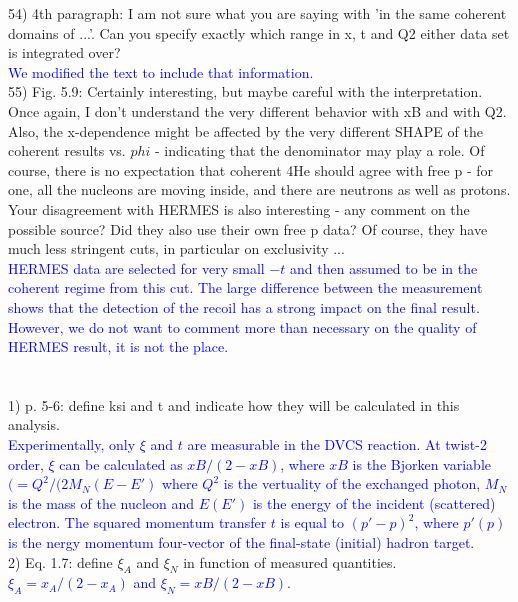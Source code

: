 54) 4th paragraph: I am not sure what you are saying with 'in the same coherent 
domains of ...'. Can you specify exactly which range in x, t and Q2 either data 
set is integrated over?\\
\textcolor{blue}{We modified the text to include that information. }\\

55) Fig. 5.9: Certainly interesting, but maybe careful with the interpretation.  
Once again, I don't understand the very different behavior with xB and with Q2.  
Also, the x-dependence might be affected by the very different SHAPE of the 
coherent results vs. $phi$ - indicating that the denominator may play a role. Of 
course, there is no expectation that coherent 4He should agree with free p - 
for one, all the nucleons are moving inside, and there are neutrons as well as 
protons.  Your disagreement with HERMES is also interesting - any comment on 
the possible source? Did they also use their own free p data? Of course, they 
have much less stringent cuts, in particular on exclusivity ... \\
\textcolor{blue}{HERMES data are selected for very small $-t$ and then assumed
to be in the coherent regime from this cut. The large difference between the 
measurement shows that the detection of the recoil has a strong impact on the 
final result. However, we do not want to comment more than necessary on the 
quality of HERMES result, it is not the place.}\\


\section*{}

1) p. 5-6: define ksi and t and indicate how they will be calculated in this 
analysis.\\
   \textcolor{blue}{ Experimentally, only  $\xi$ and $t$ are 
      measurable in the DVCS reaction. At twist-2 order, $\xi$ can be 
      calculated as $xB/(2-xB)$, where $xB$ is the Bjorken variable $(= 
      Q^{2}/(2M_{N}(E-E')$ where $Q^2$ is the vertuality of the exchanged 
      photon, $M_{N}$ is the mass of the nucleon and $E (E')$ is the energy of 
      the incident (scattered) electron. The squared
 momentum transfer $t$  is equal to $(p'- p)^{2}$, where $p' (p)$ is the nergy 
 momentum four-vector of the final-state (initial) hadron target. }\\

2) Eq. 1.7: define $\xi_{A}$ and $\xi_{N}$ in function of measured quantities. \\
\textcolor{blue}{ $ \xi_{A}= x_{A}/(2-x_{A})$ and  $\xi_{N}= xB/(2-xB)$.
}\\

